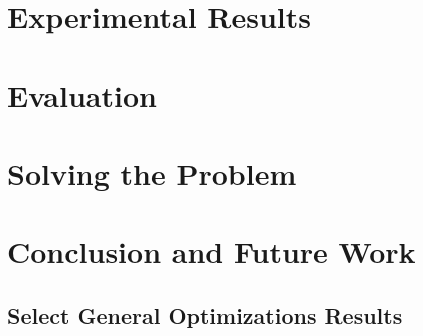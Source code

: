 \documentclass[10pt]{article}
\begin{document}
\section{Experimental Results}


\section{Evaluation}


\section{Solving the Problem}


\section{Conclusion and Future Work}


\pagebreak




\pagebreak
\begin{appendices}



\section{Select General Optimizations Results}
\label{appendix:general-optimizations-results}
%

\end{appendices}
\end{document}
